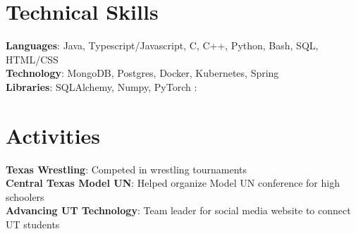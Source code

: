\documentclass[letterpaper,11pt]{article}
\begin{document}
%
\section{Technical Skills}
 \begin{itemize}[leftmargin=0.15in, label={}]
    \small{\item{
     \textbf{Languages}{: Java, Typescript/Javascript, C, C++, Python, Bash, SQL, HTML/CSS} \\
     \textbf{Technology}{: MongoDB, Postgres, Docker, Kubernetes, Spring} \\
     \textbf{Libraries}{: SQLAlchemy, Numpy, PyTorch}
     \textbf{}{: } \\
    }}
 \end{itemize}

\section{Activities}
 \begin{itemize}[leftmargin=0.15in, label={}]
    \small{\item{
     \textbf{Texas Wrestling}{: Competed in wrestling tournaments} \\
     \textbf{Central Texas Model UN}{: Helped organize Model UN conference for high schoolers} \\
     \textbf{Advancing UT Technology}{: Team leader for social media website to connect UT students} \\
    }}
 \end{itemize}


\end{document}
